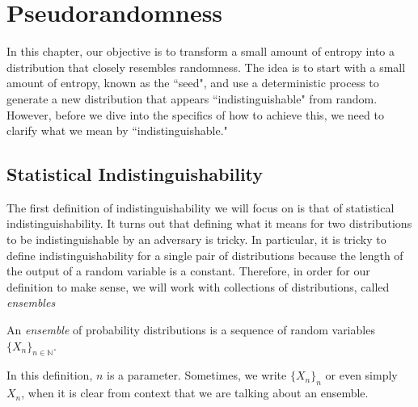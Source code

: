 \documentclass[12pt]{tufte-book}
\begin{document}
%
%
%
%
%
%
%

\chapter{Pseudorandomness}
In this chapter, our objective is to transform a small amount of entropy into a distribution that closely resembles randomness.
The idea is to start with a small amount of entropy, known as the ``seed", and use a deterministic process to generate a new distribution that appears ``indistinguishable" from random. 
However, before we dive into the specifics of how to achieve this, we need to clarify what we mean by ``indistinguishable."

\section{Statistical Indistinguishability}
The first definition of indistinguishability we will focus on is that of statistical indistinguishability.
It turns out that defining what it means for two distributions to be indistinguishable by an adversary is tricky.
In particular, it is tricky to define indistinguishability for a single pair of distributions because the length of the output of a random variable is a constant.
Therefore, in order for our definition to make sense, we will work with collections of distributions, called \emph{ensembles}
\begin{definition}
An \emph{ensemble} of probability distributions is a sequence of random variables $\{X_n\}_{n\in \mathbb{N}}$. 
\end{definition}
In this definition, $n$ is a parameter.
Sometimes, we write $\{X_n\}_n$ or even simply $X_n$, when it is clear from context that we are talking about an ensemble.
\end{document}
